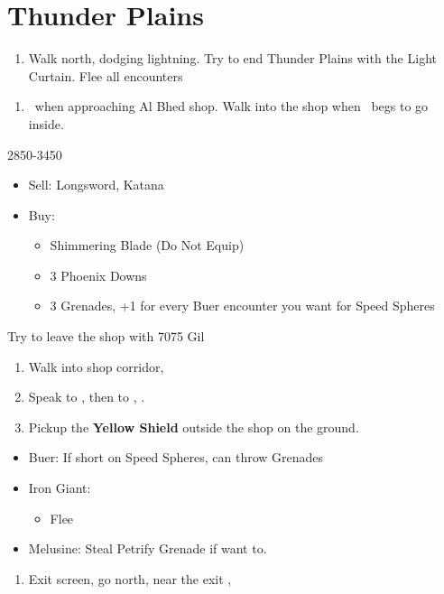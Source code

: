 \chapter{Thunder Plains}

\begin{enumerate}
	\item Walk north, dodging lightning. Try to end Thunder Plains with the Light Curtain. Flee all encounters
\end{enumerate}
\begin{enumerate}[resume]
	\item \sd\ when approaching Al Bhed shop. Walk into the shop when \rikku\ begs to go inside.
\end{enumerate}
\begin{shop}{2850-3450}
	\begin{itemize}
		\item Sell: Longsword, Katana
		\item Buy:
		      \begin{itemize}
			      \item Shimmering Blade (Do Not Equip)
			      \item 3 Phoenix Downs
			      \item 3 Grenades, +1 for every Buer encounter you want for Speed Spheres
		      \end{itemize}
	\end{itemize}
	Try to leave the shop with 7075 Gil
\end{shop}
\begin{enumerate}[resume]
	\item Walk into shop corridor, \cs[2:00]
	\item Speak to \auron, then to \rikku, \sd.
	\item Pickup the \textbf{Yellow Shield} outside the shop on the ground.
\end{enumerate}

\begin{encounters}
	\begin{itemize}
		\item Buer: If short on Speed Spheres, can throw Grenades
		\item Iron Giant:
		      \begin{itemize}
			      \switch{\tidus}{\rikku}
			      \rikkuf Steal Light Curtain
			      \switch{\wakka}{\tidus}
			      \tidusf Defend
			      \enemyf Attacks \rikku
			      \auronf Defend
			      \item Flee
		      \end{itemize}
		\item Melusine: Steal Petrify Grenade if want to.
	\end{itemize}
\end{encounters}
\begin{enumerate}[resume]
	\item Exit screen, go north, near the exit \sd, \cs[3:10]
\end{enumerate}